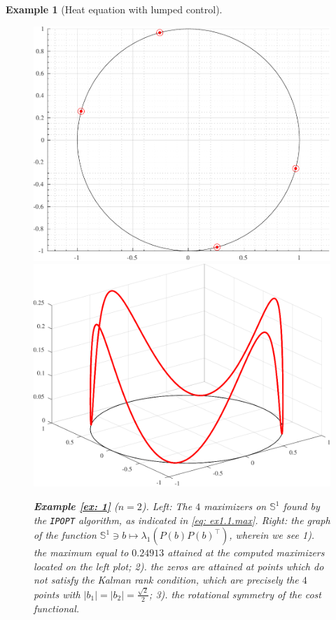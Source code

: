 \documentclass[11pt, a4paper, reqno]{amsart}
\theoremstyle{plain}
\numberwithin{equation}{section}
\newtheorem{example}{Example}[section]
\begin{document}
\begin{example}[Heat equation with lumped control]
	\begin{figure}
	\includegraphics[scale=0.42]{figures/heat_opt}
	\hspace{0.1cm}
	\includegraphics[scale=0.42]{figures/heat}
	\caption{\textbf{Example \ref{ex: 1}} ($n=2$). \emph{Left}: The $4$ maximizers on $\mathbb{S}^1$ found by the \texttt{IPOPT} algorithm, as indicated in \eqref{eq: ex1.1.max}. \emph{Right}: the graph of the function $\mathbb{S}^1\ni b\mapsto\lambda_1(P(b)P(b)^\top)$, wherein we see 1). the maximum equal to $0.24913$ attained at the computed maximizers located on the left plot; 2). the zeros are attained at points which do not satisfy the Kalman rank condition, which are precisely the $4$ points with $|b_1|=|b_2|=\frac{\sqrt{2}}{2}$; 3). the rotational symmetry of the cost functional.}
	\label{fig: ex1.1}
	\end{figure}
	

\end{example}
\end{document}
